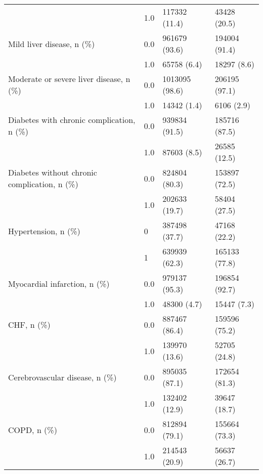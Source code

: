 \begin{tabular}{llll}
                                       & 1.0 &                         117332 (11.4) &      43428 (20.5) \\
Mild liver disease, n (\%) & 0.0 &                         961679 (93.6) &     194004 (91.4) \\
                                       & 1.0 &                           65758 (6.4) &       18297 (8.6) \\
Moderate or severe liver disease, n (\%) & 0.0 &                        1013095 (98.6) &     206195 (97.1) \\
                                       & 1.0 &                           14342 (1.4) &        6106 (2.9) \\
Diabetes with chronic complication, n (\%) & 0.0 &                         939834 (91.5) &     185716 (87.5) \\
                                       & 1.0 &                           87603 (8.5) &      26585 (12.5) \\
Diabetes without chronic complication, n (\%) & 0.0 &                         824804 (80.3) &     153897 (72.5) \\
                                       & 1.0 &                         202633 (19.7) &      58404 (27.5) \\
Hypertension, n (\%) & 0 &                         387498 (37.7) &      47168 (22.2) \\
                                       & 1 &                         639939 (62.3) &     165133 (77.8) \\
Myocardial infarction, n (\%) & 0.0 &                         979137 (95.3) &     196854 (92.7) \\
                                       & 1.0 &                           48300 (4.7) &       15447 (7.3) \\
CHF, n (\%) & 0.0 &                         887467 (86.4) &     159596 (75.2) \\
                                       & 1.0 &                         139970 (13.6) &      52705 (24.8) \\
Cerebrovascular disease, n (\%) & 0.0 &                         895035 (87.1) &     172654 (81.3) \\
                                       & 1.0 &                         132402 (12.9) &      39647 (18.7) \\
COPD, n (\%) & 0.0 &                         812894 (79.1) &     155664 (73.3) \\
                                       & 1.0 &                         214543 (20.9) &      56637 (26.7) \\

\end{tabular}
